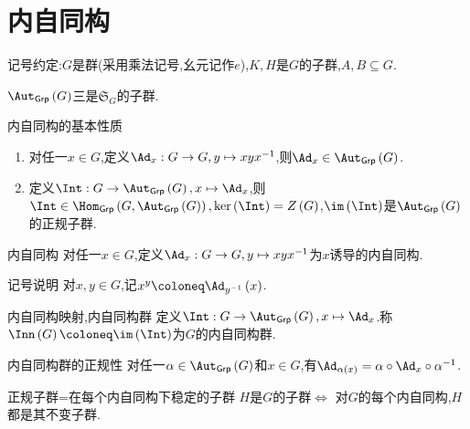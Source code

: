 \section{内自同构}

记号约定:$G$是群(采用乘法记号,幺元记作$e$),$K,H$是$G$的子群,$A,B\subseteq G$.

\begin{proposition}{}{}
	$\Aut_{\mathsf{Grp}}\left(G\right)$三是$\mathfrak{S}_{G}$的子群.
\end{proposition}

\begin{proposition}{内自同构的基本性质}{}
	\begin{enumerate}
		\item 对任一$x\in G$,定义$\Ad_{x}:G\to G,y\mapsto xyx^{-1}$,则$\Ad_{x}\in\Aut_{\mathsf{Grp}}\left(G\right)$.
		\item 定义$\Int:G\to\Aut_{\mathsf{Grp}}\left(G\right),x\mapsto\Ad_{x}$,则$\Int\in\Hom_{\mathsf{Grp}}\left(G,\Aut_{\mathsf{Grp}}\left(G\right)\right),\ker\left(\Int\right)=Z\left(G\right)$,$\im\left(\Int\right)$是$\Aut_{\mathsf{Grp}}\left(G\right)$的正规子群.
	\end{enumerate}
\end{proposition}

\begin{definition}{内自同构}{}
	对任一$x\in G$,定义$\Ad_{x}:G\to G,y\mapsto xyx^{-1}$为$x$诱导的内自同构.
\end{definition}

\begin{remark}{记号说明}{}
	对$x,y\in G$,记$x^{y}\coloneq\Ad_{y^{-1}}\left(x\right)$.
\end{remark}

\begin{definition}{内自同构映射,内自同构群}{}
	定义$\Int:G\to\Aut_{\mathsf{Grp}}\left(G\right),x\mapsto\Ad_{x}$.称$\Inn\left(G\right)\coloneq\im\left(\Int\right)$为$G$的内自同构群.
\end{definition}

\begin{proposition}{内自同构群的正规性}{}
	对任一$\alpha\in\Aut_{\mathsf{Grp}}\left(G\right)$和$x\in G$,有$\Ad_{\alpha\left(x\right)}=\alpha\circ\Ad_{x}\circ\alpha^{-1}$.
\end{proposition}

\begin{proposition}{正规子群=在每个内自同构下稳定的子群}{}
	$H$是$G$的子群$\iff$ 对$G$的每个内自同构,$H$都是其不变子群.
\end{proposition}

